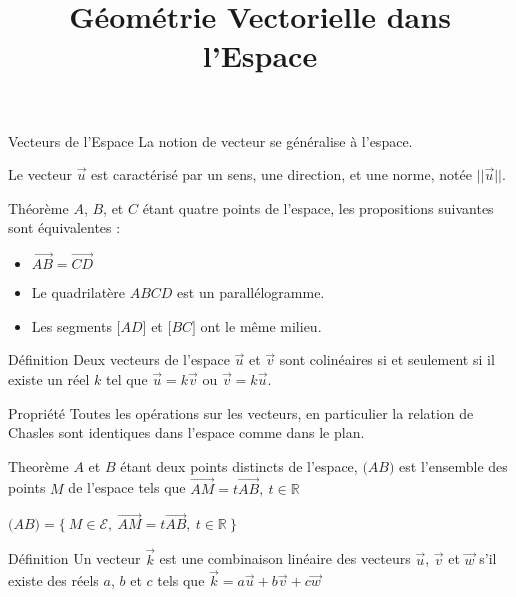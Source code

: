 \documentclass{cours}
\title{Géométrie Vectorielle dans l'Espace}
\begin{document}

    \begin{Gpartie}{Vecteurs de l'Espace} 
        La notion de vecteur se généralise à l'espace.

        Le vecteur $\vec{u}$ est caractérisé par un sens, une direction, et une norme, notée $\lvert\lvert{\vec{u}}\rvert\rvert$.
        \begin{Spartie}{Théorème} 
            $A$, $B$, et $C$ étant quatre points de l'espace, les propositions suivantes sont équivalentes :
            \begin{itemize}
                \item $\overrightarrow{AB}=\overrightarrow{CD}$
                \item Le quadrilatère $ABCD$ est un parallélogramme.
                \item Les segments $\big[AD\big]$ et $\big[BC\big]$ ont le même milieu.
            \end{itemize}
        \end{Spartie}
        \begin{Spartie}{Définition} 
            Deux vecteurs de l'espace $\vec{u}$ et $\vec{v}$ sont colinéaires si et seulement si il existe un réel $k$ tel que $\vec{u}=k\vec{v}$ ou $\vec{v}=k\vec{u}$.
        \end{Spartie}
        \begin{Spartie}{Propriété} 
            Toutes les opérations sur les vecteurs, en particulier la relation de Chasles sont identiques dans l'espace comme dans le plan.
        \end{Spartie}
        \begin{Spartie}{Theorème} 
            $A$ et $B$ étant deux points distincts de l'espace, $\big(AB\big)$ est l'ensemble des points $M$ de l'espace tels que $\overrightarrow{AM}=t \overrightarrow{AB},\ t\in\mathbb{R}$

            $\big(AB\big)=\big\{~M\in\mathcal{E},~\overrightarrow{AM}=t\overrightarrow{AB},~t\in\mathbb{R}~\big\}$
        \end{Spartie}
        \begin{Spartie}{Définition} 
            Un vecteur $\vec{k}$ est une combinaison linéaire des vecteurs $\vec{u}$, $\vec{v}$ et $\vec{w}$ s'il existe des réels $a$, $b$ et $c$ tels que $\vec{k}=a\vec{u}+b\vec{v}+c\vec{w}$
        \end{Spartie}
    \end{Gpartie}
\end{document}
